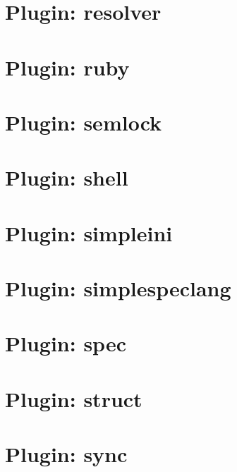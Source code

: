 \documentclass[twoside]{book}
\newcommand{\+}{\discretionary{\mbox{\scriptsize$\hookleftarrow$}}{}{}}
\begin{document}
\chapter{Plugin\+: resolver}
\label{md_src_plugins_resolver_README}

\chapter{Plugin\+: ruby}
\label{md_src_plugins_ruby_README}

\chapter{Plugin\+: semlock}
\label{md_src_plugins_semlock_README}

\chapter{Plugin\+: shell}
\label{md_src_plugins_shell_README}

\chapter{Plugin\+: simpleini}
\label{md_src_plugins_simpleini_README}

\chapter{Plugin\+: simplespeclang}
\label{md_src_plugins_simplespeclang_README}

\chapter{Plugin\+: spec}
\label{md_src_plugins_spec_README}

\chapter{Plugin\+: struct}
\label{md_src_plugins_struct_README}

\chapter{Plugin\+: sync}
\label{md_src_plugins_sync_README}

\end{document}
